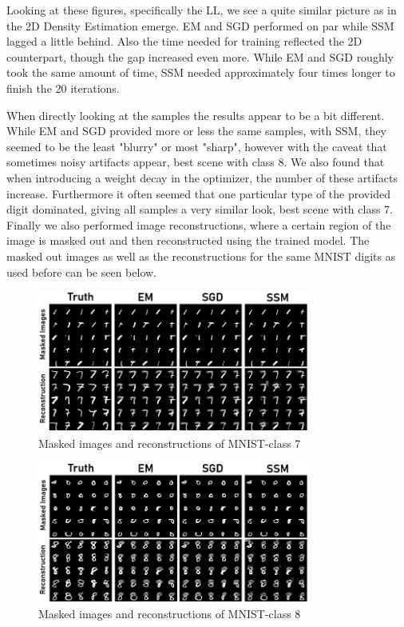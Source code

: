 Looking at these figures, specifically the LL, we see a quite similar picture as in the 2D Density Estimation emerge. 
EM and SGD performed on par while SSM lagged a little behind. 
Also the time needed for training reflected the 2D counterpart, though the gap increased even more. While EM and SGD roughly took the same amount of time, SSM needed approximately four times longer to finish the 20 iterations. 

When directly looking at the samples the results appear to be a bit different. While EM and SGD provided more or less the same samples, with SSM, they seemed to be the least "blurry" or most "sharp", however with the caveat
that sometimes noisy artifacts appear, best scene with class 8. We also found that when introducing 
a weight decay in the optimizer, the number of these artifacts increase. Furthermore it often seemed that
one particular type of the provided digit dominated, giving all samples a very similar look, best scene with class 7. \\

Finally we also performed image reconstructions, where a certain region of the image is masked out and then reconstructed using the trained model.
The masked out images as well as the reconstructions for the same MNIST digits as used before can be seen below.

\begin{figure}[H]
    \centering
    \includegraphics[width=0.8\textwidth]{figures/einsum/mnist/reconstructions_7.png}
    \caption{Masked images and reconstructions of MNIST-class 7}
\end{figure}

\begin{figure}[H]
    \centering
    \includegraphics[width=0.8\textwidth]{figures/einsum/mnist/reconstructions_8.png}
    \caption{Masked images and reconstructions of MNIST-class 8}
\end{figure}

